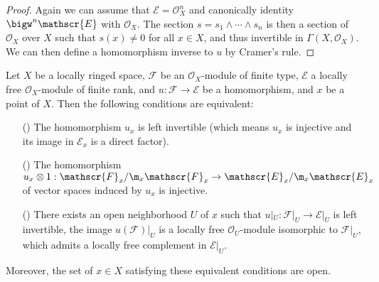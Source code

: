\begin{proof}
Again we can assume that $\mathscr{E}=\mathscr{O}_X^n$ and canonically identity $\bigw^n\mathscr{E}$ with $\mathscr{O}_X$. The section $s=s_1\wedge\cdots\wedge s_n$ is then a section of $\mathscr{O}_X$ over $X$ such that $s(x)\neq 0$ for all $x\in X$, and thus invertible in $\Gamma(X,\mathscr{O}_X)$. We can then define a homomorphism inverse to $u$ by Cramer's rule.
\end{proof}
\begin{proposition}\label{sheaf of module homomorphism ft to local free prop}
Let $X$ be a locally ringed space, $\mathscr{F}$ be an $\mathscr{O}_X$-module of finite type, $\mathscr{E}$ a locally free $\mathscr{O}_X$-module of finite rank, and $u:\mathscr{F}\to\mathscr{E}$ be a homomorphism, and $x$ be a point of $X$. Then the following conditions are equivalent:
\begin{itemize}
\item[(\rmnum{1})] The homomorphism $u_x$ is left invertible (which means $u_x$ is injective and its image in $\mathscr{E}_x$ is a direct factor). 
\item[(\rmnum{2})] The homomorphism $u_x\otimes 1:\mathscr{F}_x/\m_x\mathscr{F}_x\to\mathscr{E}_x/\m_x\mathscr{E}_x$ of vector spaces induced by $u_x$ is injective.
\item[(\rmnum{3})] There exists an open neighborhood $U$ of $x$ such that $u|_U:\mathscr{F}|_U\to\mathscr{E}|_U$ is left invertible, the image $u(\mathscr{F})|_U$ is a locally free $\mathscr{O}_U$-module isomorphic to $\mathscr{F}|_U$, which admits a locally free complement in $\mathscr{E}|_U$.
\end{itemize}
Moreover, the set of $x\in X$ satisfying these equivalent conditions are open.
\end{proposition}
